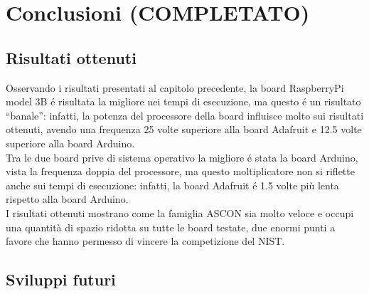 \chapter{Conclusioni (COMPLETATO)}

\section{Risultati ottenuti}

Osservando i risultati presentati al capitolo precedente, la board RaspberryPi model 3B é risultata la migliore nei tempi di esecuzione, ma questo é un risultato ``banale'': infatti, la potenza del processore della board influisce molto sui risultati ottenuti, avendo una frequenza 25 volte superiore alla board Adafruit e 12.5 volte superiore alla board Arduino. \\

\noindent Tra le due board prive di sistema operativo la migliore é stata la board Arduino, vista la frequenza doppia del processore, ma questo moltiplicatore non si riflette anche sui tempi di esecuzione: infatti, la board Adafruit é 1.5 volte più lenta rispetto alla board Arduino. \\

\noindent I risultati ottenuti mostrano come la famiglia ASCON sia molto veloce e occupi una quantità di spazio ridotta su tutte le board testate, due enormi punti a favore che hanno permesso di vincere la competizione del NIST.

\section{Sviluppi futuri}


